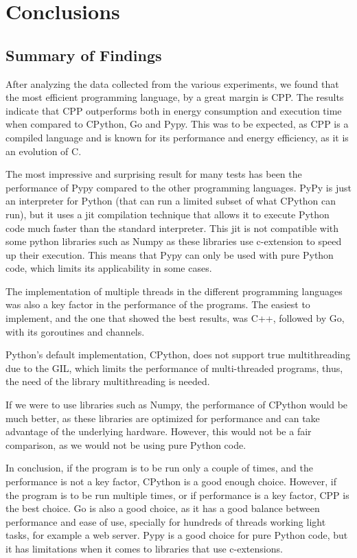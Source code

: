 \chapter{Conclusions}\label{chap:conclusions}


\section{Summary of Findings}
After analyzing the data collected from the various experiments, we found that the most efficient programming language, by a great margin is \gls{CPP}. The results indicate that \gls{CPP} outperforms both in energy consumption and execution time when compared to \gls{CPython}, Go and Pypy. This was to be expected, as \gls{CPP} is a compiled language and is known for its performance and energy efficiency, as it is an evolution of C.

The most impressive and surprising result for many tests has been the performance of Pypy compared to the other programming languages. PyPy is just an interpreter for Python (that can run a limited subset of what \gls{CPython} can run), but it uses a \gls{jit} compilation technique that allows it to execute Python code much faster than the standard interpreter. This \gls{jit} is not compatible with some python libraries such as Numpy \cite{numpy} as these libraries use \gls{c-extension} to speed up their execution. This means that Pypy can only be used with pure Python code, which limits its applicability in some cases.

The implementation of multiple threads in the different programming languages was also a key factor in the performance of the programs. The easiest to implement, and the one that showed the best results, was C++, followed by Go, with its \glspl{goroutine} and \glspl{channel}. 

Python's default implementation, \gls{CPython}, does not support true multithreading due to the \gls{GIL}, which limits the performance of multi-threaded programs, thus, the need of the library multithreading is needed.

If we were to use libraries such as Numpy, the performance of \gls{CPython} would be much better, as these libraries are optimized for performance and can take advantage of the underlying hardware. However, this would not be a fair comparison, as we would not be using pure Python code.

In conclusion, if the program is to be run only a couple of times, and the performance is not a key factor, \gls{CPython} is a good enough choice. However, if the program is to be run multiple times, or if performance is a key factor, \gls{CPP} is the best choice. Go is also a good choice, as it has a good balance between performance and ease of use, specially for hundreds of threads working light tasks, for example a web server. Pypy is a good choice for pure Python code, but it has limitations when it comes to libraries that use \glspl{c-extension}.

